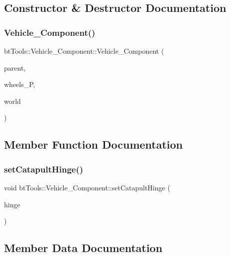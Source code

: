 \subsection{Constructor \& Destructor Documentation}
\mbox{\label{classbt_tools_1_1_vehicle___component_aee0ac52f5e4e01b91c8ccb15a97016b4}} 
\subsubsection{Vehicle\_Component()}
{\footnotesize\ttfamily bt\+Tools\+::\+Vehicle\+\_\+\+Component\+::\+Vehicle\+\_\+\+Component (\begin{DoxyParamCaption}\item[{shared\+\_\+ptr$<$ \textbf{ Entity} $>$ \&}]{parent,  }\item[{vector$<$ shared\+\_\+ptr$<$ \textbf{ Entity} $>$$>$ \&}]{wheels\+\_\+P,  }\item[{shared\+\_\+ptr$<$ bt\+Discrete\+Dynamics\+World $>$}]{world }\end{DoxyParamCaption})\hspace{0.3cm}{\ttfamily [inline]}}



\subsection{Member Function Documentation}
\mbox{\label{classbt_tools_1_1_vehicle___component_a6c8e531da8c1464b8e2e362a1a38ea91}} 
\subsubsection{setCatapultHinge()}
{\footnotesize\ttfamily void bt\+Tools\+::\+Vehicle\+\_\+\+Component\+::set\+Catapult\+Hinge (\begin{DoxyParamCaption}\item[{shared\+\_\+ptr$<$ bt\+Hinge\+Constraint $>$}]{hinge }\end{DoxyParamCaption})\hspace{0.3cm}{\ttfamily [inline]}}



\subsection{Member Data Documentation}
\mbox{\label{classbt_tools_1_1_vehicle___component_a15efb9e424b8cecb95a96ea7c42d7263}} 
